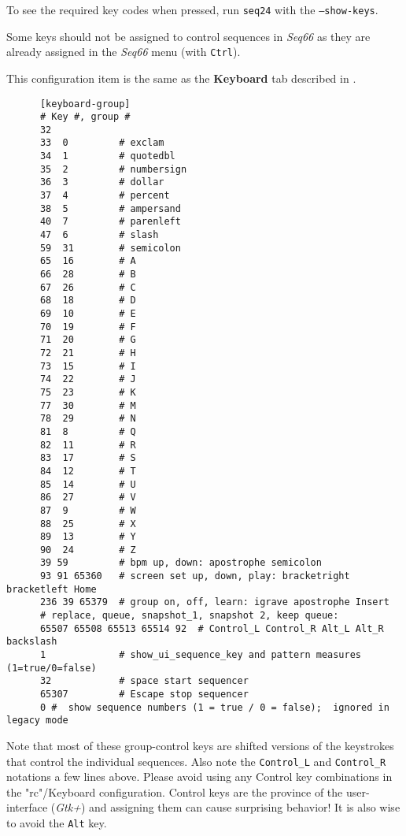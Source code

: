    To see the required key codes when pressed, run \texttt{seq24} with
   the \texttt{--show-keys}.

   Some keys should not be assigned to control sequences in
   \textsl{Seq66} as they are already assigned in the
   \textsl{Seq66} menu (with \texttt{Ctrl}). 

   This configuration item is the same as the 
   \textbf{Keyboard} tab described in
   .

   \begin{verbatim}
      [keyboard-group]
      # Key #, group # 
      32
      33  0         # exclam
      34  1         # quotedbl
      35  2         # numbersign
      36  3         # dollar
      37  4         # percent
      38  5         # ampersand
      40  7         # parenleft
      47  6         # slash
      59  31        # semicolon
      65  16        # A
      66  28        # B
      67  26        # C
      68  18        # D
      69  10        # E
      70  19        # F
      71  20        # G
      72  21        # H
      73  15        # I
      74  22        # J
      75  23        # K
      77  30        # M
      78  29        # N
      81  8         # Q
      82  11        # R
      83  17        # S
      84  12        # T
      85  14        # U
      86  27        # V
      87  9         # W
      88  25        # X
      89  13        # Y
      90  24        # Z
      39 59         # bpm up, down: apostrophe semicolon
      93 91 65360   # screen set up, down, play: bracketright bracketleft Home
      236 39 65379  # group on, off, learn: igrave apostrophe Insert
      # replace, queue, snapshot_1, snapshot 2, keep queue:
      65507 65508 65513 65514 92  # Control_L Control_R Alt_L Alt_R backslash
      1             # show_ui_sequence_key and pattern measures (1=true/0=false)
      32            # space start sequencer
      65307         # Escape stop sequencer
      0 #  show sequence numbers (1 = true / 0 = false);  ignored in legacy mode
   \end{verbatim}

   Note that most of these group-control keys are shifted versions of the
   keystrokes that control the individual sequences.  Also note the
   \texttt{Control\_L} and \texttt{Control\_R} notations a few lines above.
   Please avoid using any Control key combinations in the "rc"/Keyboard
   configuration.  Control keys are the province of the user-interface
   (\textsl{Gtk+}) and assigning them can cause surprising behavior!
   It is also wise to avoid the \texttt{Alt} key.

